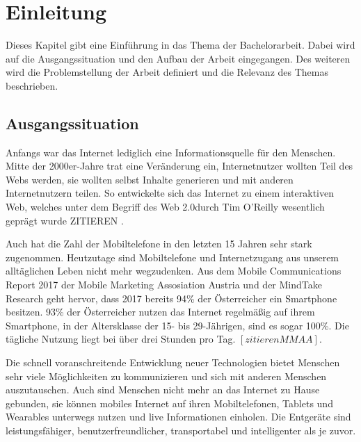 


\chapter{Einleitung}
\label{ch:Einleitung}
Dieses Kapitel gibt eine Einführung in das Thema der Bachelorarbeit. Dabei wird auf die Ausgangssituation und den Aufbau der Arbeit eingegangen. Des weiteren wird die Problemstellung der Arbeit definiert und die Relevanz des Themas beschrieben.


\section{Ausgangssituation}

Anfangs war das Internet lediglich eine Informationsquelle für den Menschen. Mitte der 2000er-Jahre trat eine Veränderung ein, Internetnutzer wollten Teil des Webs werden, sie wollten selbst Inhalte generieren und mit anderen Internetnutzern teilen. So entwickelte sich das Internet zu einem interaktiven Web, welches unter dem Begriff des \dq Web 2.0\dq  durch Tim O'Reilly wesentlich geprägt wurde ZITIEREN \cite{oreilly}.

Auch hat die Zahl der Mobiltelefone in den letzten 15 Jahren sehr stark zugenommen.
Heutzutage sind Mobiltelefone und Internetzugang aus unserem alltäglichen Leben nicht mehr wegzudenken. Aus dem Mobile Communications Report 2017 der Mobile Marketing Assosiation Austria und der MindTake Research geht hervor, dass 2017 bereits 94\% der Österreicher ein Smartphone besitzen. 93\% der Österreicher nutzen das Internet regelmäßig auf ihrem Smartphone, in der Altersklasse der 15- bis 29-Jährigen, sind es sogar 100\%. Die tägliche Nutzung liegt bei über drei Stunden pro Tag. $[zitieren MMAA]$.

Die schnell voranschreitende Entwicklung neuer Technologien bietet Menschen sehr viele Möglichkeiten zu kommunizieren und sich mit anderen Menschen auszutauschen. Auch sind Menschen nicht mehr an das Internet zu Hause gebunden, sie können mobiles Internet auf ihren Mobiltelefonen, Tablets und Wearables unterwegs nutzen und live Informationen einholen. Die Entgeräte sind leistungsfähiger, benutzerfreundlicher, transportabel und intelligenter als je zuvor.

